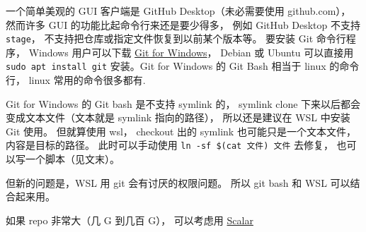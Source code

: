 

一个简单美观的 GUI 客户端是 GitHub Desktop（未必需要使用 github.com）， 然而许多 GUI 的功能比起命令行来还是要少得多， 例如 GitHub Desktop 不支持 \verb|stage|， 不支持把仓库或指定文件恢复到以前某个版本等。 要安装 Git 命令行程序， Windows 用户可以下载 \href{https://gitforwindows.org/}{Git for Windows}， Debian 或 Ubuntu 可以直接用 \verb|sudo apt install git| 安装。Git for Windows 的 Git Bash 相当于 linux 的命令行， linux 常用的命令很多都有.

Git for Windows 的 Git bash 是不支持 symlink 的， symlink clone 下来以后都会变成文本文件（文本就是 symlink 指向的路径）， 所以还是建议在 WSL 中安装 Git 使用。 但就算使用 wsl， checkout 出的 symlink 也可能只是一个文本文件， 内容是目标的路径。 此时可以手动使用 \verb|ln -sf $(cat 文件) 文件| 去修复， 也可以写一个脚本（见文末）。

但新的问题是，WSL 用 git 会有讨厌的权限问题。 所以 git bash 和 WSL 可以结合起来用。

如果 repo 非常大（几 G 到几百 G）， 可以考虑用 \href{https://git-scm.com/docs/scalar}{Scalar}


